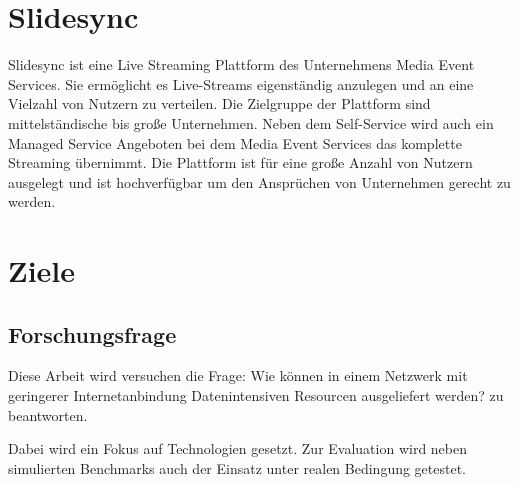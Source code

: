 \section{Slidesync}
Slidesync ist eine Live Streaming Plattform des Unternehmens Media Event Services. Sie ermöglicht es Live-Streams eigenständig anzulegen und an eine Vielzahl von Nutzern zu verteilen. Die Zielgruppe der Plattform sind mittelständische bis große Unternehmen. Neben dem Self-Service wird auch ein Managed Service Angeboten bei dem Media Event Services das komplette Streaming übernimmt. Die Plattform ist für eine große Anzahl von Nutzern ausgelegt und ist hochverfügbar um den Ansprüchen von Unternehmen gerecht zu werden. 

\section{Ziele}
\subsection{Forschungsfrage}
Diese Arbeit wird versuchen die Frage: 
Wie können in einem Netzwerk mit geringerer Internetanbindung Datenintensiven Resourcen ausgeliefert werden? 
zu beantworten.

Dabei wird ein Fokus auf \pTp Technologien gesetzt. Zur Evaluation wird neben simulierten Benchmarks auch der Einsatz unter realen Bedingung getestet.  

